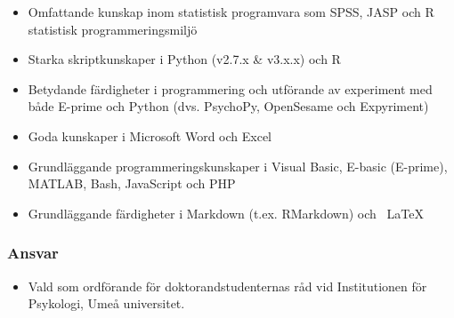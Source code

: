 \documentclass[]{article}
\providecommand{\tightlist}{%
  \setlength{\itemsep}{0pt}\setlength{\parskip}{0pt}}
\begin{document}
\begin{itemize}
\tightlist
\item
  Omfattande kunskap inom statistisk programvara som SPSS, JASP och R
  statistisk programmeringsmiljö
\item
  Starka skriptkunskaper i Python (v2.7.x \& v3.x.x) och R
\item
  Betydande färdigheter i programmering och utförande av experiment med
  både E-prime och Python (dvs. PsychoPy, OpenSesame och Expyriment)
\item
  Goda kunskaper i Microsoft Word och Excel
\item
  Grundläggande programmeringskunskaper i Visual Basic, E-basic
  (E-prime), MATLAB, Bash, JavaScript och PHP
\item
  Grundläggande färdigheter i Markdown (t.ex. RMarkdown) och ~LaTeX
\end{itemize}

\hypertarget{ansvar}{%
\subsubsection{Ansvar}\label{ansvar}}

\begin{itemize}
\tightlist
\item
  Vald som ordförande för doktorandstudenternas råd vid Institutionen
  för Psykologi, Umeå universitet.
\end{itemize}

\newpage
\pagestyle{empty}
\end{document}
